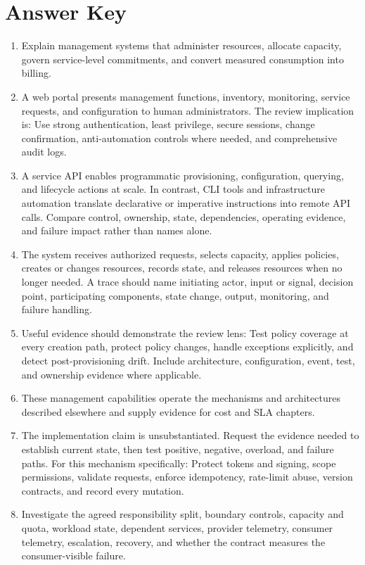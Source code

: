 \documentclass[11pt]{article}
\begin{document}
\section{Answer Key}
\begin{enumerate}
\item Explain management systems that administer resources, allocate capacity, govern service-level commitments, and convert measured consumption into billing.
\item A web portal presents management functions, inventory, monitoring, service requests, and configuration to human administrators. The review implication is: Use strong authentication, least privilege, secure sessions, change confirmation, anti-automation controls where needed, and comprehensive audit logs.
\item A service API enables programmatic provisioning, configuration, querying, and lifecycle actions at scale. In contrast, CLI tools and infrastructure automation translate declarative or imperative instructions into remote API calls. Compare control, ownership, state, dependencies, operating evidence, and failure impact rather than names alone.
\item The system receives authorized requests, selects capacity, applies policies, creates or changes resources, records state, and releases resources when no longer needed. A trace should name initiating actor, input or signal, decision point, participating components, state change, output, monitoring, and failure handling.
\item Useful evidence should demonstrate the review lens: Test policy coverage at every creation path, protect policy changes, handle exceptions explicitly, and detect post-provisioning drift. Include architecture, configuration, event, test, and ownership evidence where applicable.
\item These management capabilities operate the mechanisms and architectures described elsewhere and supply evidence for cost and SLA chapters.
\item The implementation claim is unsubstantiated. Request the evidence needed to establish current state, then test positive, negative, overload, and failure paths. For this mechanism specifically: Protect tokens and signing, scope permissions, validate requests, enforce idempotency, rate-limit abuse, version contracts, and record every mutation.
\item Investigate the agreed responsibility split, boundary controls, capacity and quota, workload state, dependent services, provider telemetry, consumer telemetry, escalation, recovery, and whether the contract measures the consumer-visible failure.

\end{enumerate}
\end{document}
